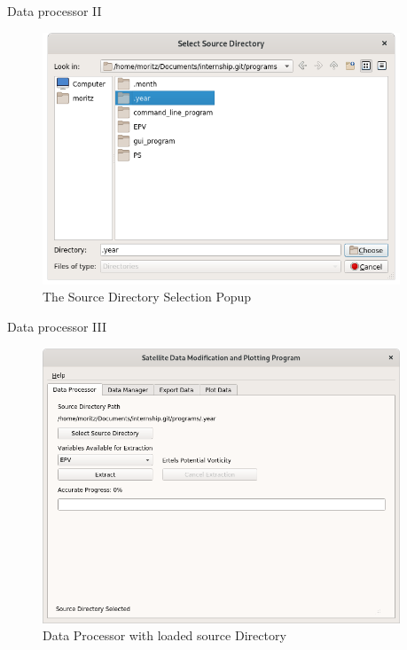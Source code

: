 \documentclass[
    hyperref={
        final,
        colorlinks=true,
        menucolor=black,
        anchorcolor=green,
        linkcolor=blue,
        citecolor=red,
        pdftitle={RS RAS Internship Presentation},
        pdfauthor={Moritz M. Konarski}
    }
]{beamer}
\begin{document}
\begin{frame}{Data processor II}
\begin{figure}
    \includegraphics[width=0.95\textwidth]{../graphics/dp02}
    \vspace{-8pt}
    \caption{The Source Directory Selection Popup}
\end{figure}
\end{frame}

\begin{frame}{Data processor III}
\begin{figure}
    \includegraphics[width=0.95\textwidth]{../graphics/dp03}
    \vspace{-8pt}
    \caption{Data Processor with loaded source Directory}
\end{figure}
\end{frame}
\end{document}

